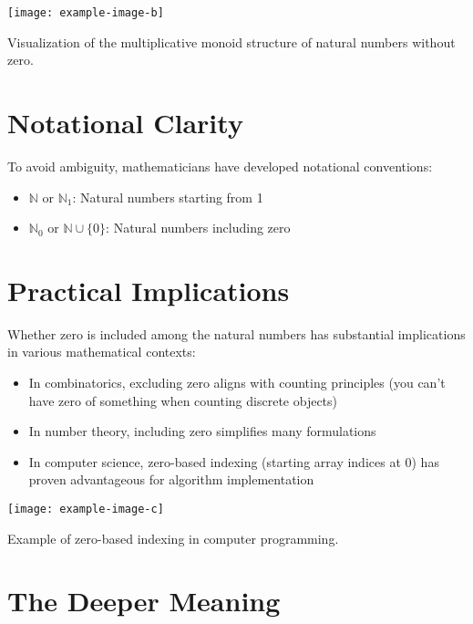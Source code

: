 \begin{marginfigure}
\texttt{[image: example-image-b]}
\caption{Visualization of the multiplicative monoid structure of natural numbers without zero.}
\end{marginfigure}

\section{Notational Clarity}

To avoid ambiguity, mathematicians have developed notational conventions:
\begin{itemize}
\item $\mathbb{N}$ or $\mathbb{N}_1$: Natural numbers starting from 1
\item $\mathbb{N}_0$ or $\mathbb{N} \cup \{0\}$: Natural numbers including zero
\end{itemize}


\section{Practical Implications}

Whether zero is included among the natural numbers has substantial implications in various mathematical contexts:

\begin{itemize}
\item In combinatorics, excluding zero aligns with counting principles (you can't have zero of something when counting discrete objects)
\item In number theory, including zero simplifies many formulations
\item In computer science, zero-based indexing (starting array indices at 0) has proven advantageous for algorithm implementation
\end{itemize}

\begin{marginfigure}
\texttt{[image: example-image-c]}
\caption{Example of zero-based indexing in computer programming.}
\end{marginfigure}

\section{The Deeper Meaning}

